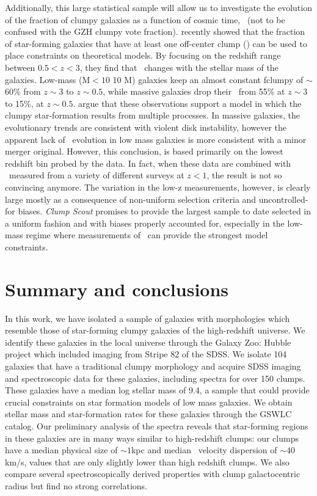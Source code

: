 Additionally, this large statistical sample will allow us to investigate the evolution of the fraction of clumpy galaxies as a function of cosmic time, \fclump~(not to be confused with the GZH clumpy vote fraction). \cite{Guo2015} recently showed that the fraction of star-forming galaxies that have at least one off-center clump (\fclump) can be used to place constraints on theoretical models. By focusing on the redshift range between $0.5 <z<3$, they find that \fclump~changes with the stellar mass of the galaxies. Low-mass (M$<10$ 10 M) galaxies keep an almost constant fclumpy of $\sim$60\% from $z\sim3$ to $z\sim0.5$, while massive galaxies drop their \fclump~from 55\% at $z\sim3$ to 15\%, at $z\sim0.5$. \cite{Guo2015} argue that these observations support a model in which the clumpy star-formation results from multiple processes. In massive galaxies, the evolutionary trends are consistent with violent disk instability, however the apparent lack of \fclump~evolution in low mass galaxies is more consistent with a minor merger original. However, this conclusion, is based primarily on the lowest redshift bin probed by the \cite{Guo2015} data. In fact, when these data are combined with \fclump~measured from a variety of different surveys at $z<1$, the result is not so convincing anymore. The variation in the low-z measurements, however, is clearly large mostly as a consequence of non-uniform selection criteria and uncontrolled-for biases. \textit{Clump Scout} promises to provide the largest sample to date selected in a uniform fashion and with biases properly accounted for, especially in the low-mass regime where measurements of \fclump~can provide the strongest model constraints.



\section{Summary and conclusions}

In this work, we have isolated a sample of galaxies with morphologies which resemble those of star-forming clumpy galaxies of the high-redshift universe. We identify these galaxies in the local universe through the Galaxy Zoo: Hubble project which included imaging from Stripe 82 of the SDSS. We isolate 104 galaxies that have a traditional clumpy morphology and acquire SDSS imaging and spectroscopic data for these galaxies, including spectra for over 150 clumps. These galaxies have a median log stellar mass of 9.4, a sample that could provide crucial constraints on star formation models of low mass galaxies. We obtain stellar mass and star-formation rates for these galaxies through the GSWLC catalog. Our preliminary analysis of the spectra reveals that star-forming regions in these galaxies are in many ways similar to high-redshift clumps: our clumps have a median physical size of $\sim1$kpc and median \ha~velocity dispersion of $\sim40$km/s, values that are only slightly lower than high redshift clumps. We also compare several spectroscopically derived properties with clump galactocentric radius but find no strong correlations. 

